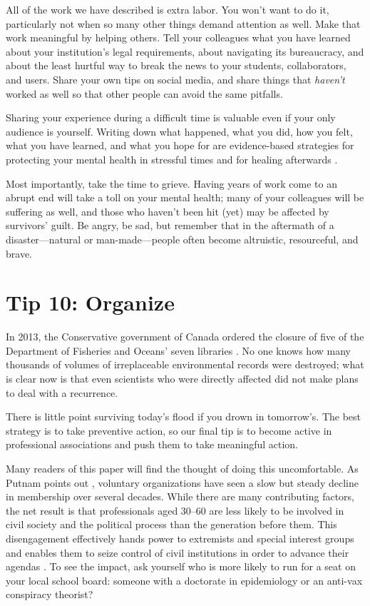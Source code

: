 \documentclass[10pt,letterpaper]{article}
\begin{document}
All of the work we have described is extra labor.
You won't want to do it,
particularly not when so many other things demand attention as well.
Make that work meaningful by helping others.
Tell your colleagues what you have learned about your institution's legal requirements,
about navigating its bureaucracy,
and about the least hurtful way to break the news to your students, collaborators, and users.
Share your own tips on social media,
and share things that \emph{haven't} worked as well
so that other people can avoid the same pitfalls.

Sharing your experience during a difficult time is valuable even if your only audience is yourself.
Writing down what happened, what you did, how you felt, what you have learned, and what you hope for
are evidence-based strategies for protecting your mental health in stressful times
and for healing afterwards \cite{Pennebaker2016,Cullen2022}.

Most importantly,
take the time to grieve.
Having years of work come to an abrupt end will take a toll on your mental health;
many of your colleagues will be suffering as well,
and those who haven't been hit (yet) may be affected by survivors' guilt.
Be angry,
be sad,
but remember that in the aftermath of a disaster---natural or man-made---people
often become altruistic, resourceful, and brave.

\section*{Tip 10: Organize}

In 2013,
the Conservative government of Canada ordered the closure of
five of the Department of Fisheries and Oceans' seven libraries \cite{Nikiforuk2013}.
No one knows how many thousands of volumes of irreplaceable environmental records were destroyed;
what is clear now is that even scientists who were directly affected
did not make plans to deal with a recurrence.

There is little point surviving today's flood if you drown in tomorrow's.
The best strategy is to take preventive action,
so our final tip is to become active in professional associations
and push them to take meaningful action.

Many readers of this paper will find the thought of doing this uncomfortable.
As Putnam points out \cite{Putnam2020},
voluntary organizations have seen a slow but steady decline in membership over several decades.
While there are many contributing factors,
the net result is that professionals aged 30--60
are less likely to be involved in civil society and the political process than the generation before them.
This disengagement effectively hands power to extremists and special interest groups
and enables them to seize control of civil institutions in order to advance their agendas \cite{BuenoDeMesquita2022}.
To see the impact,
ask yourself who is more likely to run for a seat on your local school board:
someone with a doctorate in epidemiology or an anti-vax conspiracy theorist?
\end{document}
